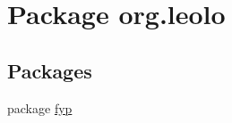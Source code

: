 \hypertarget{namespaceorg_1_1leolo}{\section{Package org.\-leolo}
\label{namespaceorg_1_1leolo}
}
\subsection*{Packages}
\begin{DoxyCompactItemize}
\item 
package \hyperlink{namespaceorg_1_1leolo_1_1fyp}{fyp}
\end{DoxyCompactItemize}
